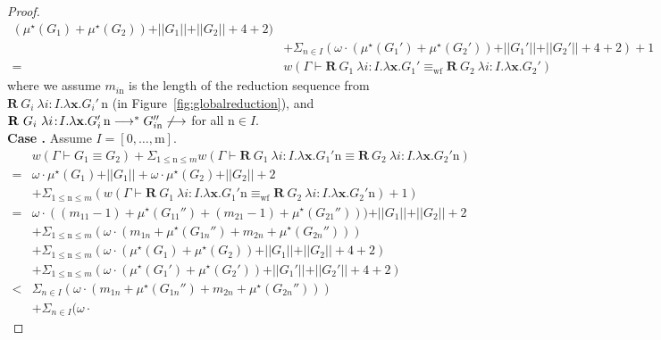 \documentclass{LMCS}
\newcommand{\RECSEQP}[4]{\ensuremath{\mathbf{R} \ #1\ \lambda #2.\lambda #3.#4}}
\newcommand{\redsym}{\ensuremath{\longrightarrow}}
\newcommand{\G}{\ensuremath{G}}
\newcommand{\trule}[1]{\text{\footnotesize{\ensuremath{\lfloor\text{\sc{#1}}\rfloor}}}}
\newcommand{\GR}[4]{\RECSEQP{#1}{#2}{#3}{#4}}
\newcommand{\ii}{\ensuremath{i}}
\newcommand{\n}{\ensuremath{\mathrm{n}}}
\newcommand{\m}{\ensuremath{\mathrm{m}}}
\newcommand{\xx}{\ensuremath{\mathbf{x}}}
\newcommand{\II}{\ensuremath{I}}
\newcommand{\AT}[2]{#1\! : \! #2}
\newcommand{\equivwf}{\equiv_{\text{wf}}}
\newcommand{\inductiontermsize}[1]{\vert\vert #1 \vert\vert}
\newcommand{\judgementsize}[1]{w(#1)}
\newcommand{\inductionreductionsize}[1]{\mu^\star(#1)}
\begin{document}
\begin{proof}
{\[\begin{array}{ll}
(\inductionreductionsize{G_1}+\inductionreductionsize{G_2})+
\inductiontermsize{G_1}+\inductiontermsize{G_2}+4+2
)\\
&  +  
\Sigma_{n\in I}
(
\omega \cdot 
(\inductionreductionsize{G_1'}+\inductionreductionsize{G_2'})+
\inductiontermsize{G_1'}+\inductiontermsize{G_2'}+4+2
)+1\\
= & 
\judgementsize{
\Gamma \vdash
\GR{\G_1}{\AT{\ii}{\II}}{\xx}{\G_1'}
\equivwf
\GR{\G_2}{\AT{\ii}{\II}}{\xx}{\G_2'}
}
\end{array}
\] 
}
where we assume ${m_{i\n}}$ is the length of the reduction 
sequence from  $\GR{\G_i}{\AT{\ii}{\II}}{\xx}{\G_i'}\, \n$ 
(in Figure~\ref{fig:globalreduction}), and 
$\GR{\G_i}{\AT{\ii}{\II}}{\xx}{\G_i'}\, \n 
 \redsym^\ast G_{i\n}'' \not\redsym$ for all $\n\in I$. 
\\[1mm]
{\bf Case \trule{WfRecF}.} Assume $I=[0,\ldots,\m]$. 
\[
\begin{array}{ll}
& 
\judgementsize{\Gamma \vdash G_1 \equiv  G_2} 
+ 
\Sigma_{1\leq \n \leq m}
\judgementsize{
\Gamma \vdash
\GR{\G_1}{\AT{\ii}{\II}}{\xx}{\G_1'} \n 
\equiv
\GR{\G_2}{\AT{\ii}{\II}}{\xx}{\G_2'} \n 
}\\
= & 
\omega\cdot \inductionreductionsize{G_1} 
+ \inductiontermsize{G_1}
+ \omega\cdot \inductionreductionsize{G_2} 
+ \inductiontermsize{G_2} + 2\\
& +  
\Sigma_{1\leq \n \leq m}
(\judgementsize{
\Gamma \vdash
\GR{\G_1}{\AT{\ii}{\II}}{\xx}{\G_1'} \n 
\equivwf 
\GR{\G_2}{\AT{\ii}{\II}}{\xx}{\G_2'} \n 
} + 1)
\\
= & 
\omega\cdot((m_{11}-1) + \inductionreductionsize{G_{11}''} + 
(m_{21}-1) + \inductionreductionsize{G_{21}''}))
+ \inductiontermsize{G_1} 
+ \inductiontermsize{G_2} + 2\\
& + \Sigma_{1\leq \n \leq m}
(
\omega\cdot(m_{1n} + \inductionreductionsize{G_{1n}''} + 
m_{2n} + \inductionreductionsize{G_{2n}''}))\\
& 
+ \Sigma_{1\leq \n \leq m}
(
\omega \cdot 
(\inductionreductionsize{G_1}+\inductionreductionsize{G_2})+
\inductiontermsize{G_1}+\inductiontermsize{G_2}+4+2
)\\
& +  
\Sigma_{1\leq \n \leq m}
(
\omega \cdot 
(\inductionreductionsize{G_1'}+\inductionreductionsize{G_2'})+
\inductiontermsize{G_1'}+\inductiontermsize{G_2'}+4+2
) \\
< & 
\Sigma_{n\in I}
(
\omega\cdot(m_{1n} + \inductionreductionsize{G_{1n}''} + 
m_{2n} + \inductionreductionsize{G_{2n}''}))\\
& 
+  \Sigma_{n\in I}
(
\omega \cdot 

\end{array}\]
\end{proof}
\end{document}
